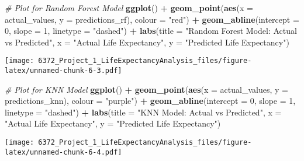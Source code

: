 \documentclass[
]{article}
\newenvironment{Shaded}{\begin{snugshade}}{\end{snugshade}}
\newcommand{\AttributeTok}[1]{\textcolor[rgb]{0.13,0.29,0.53}{#1}}
\newcommand{\CommentTok}[1]{\textcolor[rgb]{0.56,0.35,0.01}{\textit{#1}}}
\newcommand{\DecValTok}[1]{\textcolor[rgb]{0.00,0.00,0.81}{#1}}
\newcommand{\FunctionTok}[1]{\textcolor[rgb]{0.13,0.29,0.53}{\textbf{#1}}}
\newcommand{\NormalTok}[1]{#1}
\newcommand{\SpecialCharTok}[1]{\textcolor[rgb]{0.81,0.36,0.00}{\textbf{#1}}}
\newcommand{\StringTok}[1]{\textcolor[rgb]{0.31,0.60,0.02}{#1}}
\begin{document}
\begin{Shaded}
\begin{Highlighting}[]
\CommentTok{\# Plot for Random Forest Model}
\FunctionTok{ggplot}\NormalTok{() }\SpecialCharTok{+}
  \FunctionTok{geom\_point}\NormalTok{(}\FunctionTok{aes}\NormalTok{(}\AttributeTok{x =}\NormalTok{ actual\_values, }\AttributeTok{y =}\NormalTok{ predictions\_rf), }\AttributeTok{colour =} \StringTok{"red"}\NormalTok{) }\SpecialCharTok{+}
  \FunctionTok{geom\_abline}\NormalTok{(}\AttributeTok{intercept =} \DecValTok{0}\NormalTok{, }\AttributeTok{slope =} \DecValTok{1}\NormalTok{, }\AttributeTok{linetype =} \StringTok{"dashed"}\NormalTok{) }\SpecialCharTok{+}
  \FunctionTok{labs}\NormalTok{(}\AttributeTok{title =} \StringTok{"Random Forest Model: Actual vs Predicted"}\NormalTok{, }\AttributeTok{x =} \StringTok{"Actual Life Expectancy"}\NormalTok{, }\AttributeTok{y =} \StringTok{"Predicted Life Expectancy"}\NormalTok{)}
\end{Highlighting}
\end{Shaded}

\texttt{[image: 6372\_Project\_1\_LifeExpectancyAnalysis\_files/figure-latex/unnamed-chunk-6-3.pdf]}

\begin{Shaded}
\begin{Highlighting}[]
\CommentTok{\# Plot for KNN Model}
\FunctionTok{ggplot}\NormalTok{() }\SpecialCharTok{+}
  \FunctionTok{geom\_point}\NormalTok{(}\FunctionTok{aes}\NormalTok{(}\AttributeTok{x =}\NormalTok{ actual\_values, }\AttributeTok{y =}\NormalTok{ predictions\_knn), }\AttributeTok{colour =} \StringTok{"purple"}\NormalTok{) }\SpecialCharTok{+}
  \FunctionTok{geom\_abline}\NormalTok{(}\AttributeTok{intercept =} \DecValTok{0}\NormalTok{, }\AttributeTok{slope =} \DecValTok{1}\NormalTok{, }\AttributeTok{linetype =} \StringTok{"dashed"}\NormalTok{) }\SpecialCharTok{+}
  \FunctionTok{labs}\NormalTok{(}\AttributeTok{title =} \StringTok{"KNN Model: Actual vs Predicted"}\NormalTok{, }\AttributeTok{x =} \StringTok{"Actual Life Expectancy"}\NormalTok{, }\AttributeTok{y =} \StringTok{"Predicted Life Expectancy"}\NormalTok{)}
\end{Highlighting}
\end{Shaded}

\texttt{[image: 6372\_Project\_1\_LifeExpectancyAnalysis\_files/figure-latex/unnamed-chunk-6-4.pdf]}
\end{document}
